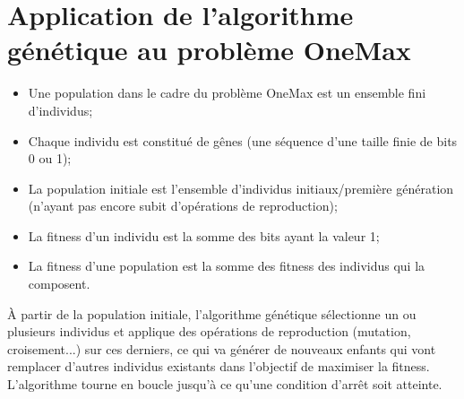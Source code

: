 \documentclass[12pt]{article}
\begin{document}
\section{Application de l'algorithme génétique au problème OneMax}
\begin{itemize}[label=-]
\item Une population dans le cadre du problème OneMax est un ensemble fini d'individus;
\item Chaque individu est constitué de gênes (une séquence d'une taille finie de bits 0 ou 1);
\item La population initiale est l'ensemble d'individus initiaux/première génération (n'ayant pas encore subit d'opérations de reproduction);
\item La fitness d'un individu est la somme des bits ayant la valeur 1;
\item La fitness d'une population est la somme des fitness des individus qui la composent.
\end{itemize}

\par À partir de la population initiale, l'algorithme génétique sélectionne un ou plusieurs individus et applique des opérations de reproduction (mutation, croisement...) sur ces derniers, ce qui va générer de nouveaux enfants qui vont remplacer d'autres individus existants dans l'objectif de maximiser la fitness. L'algorithme tourne en boucle jusqu'à ce qu'une condition d'arrêt soit atteinte. 
\end{document}

